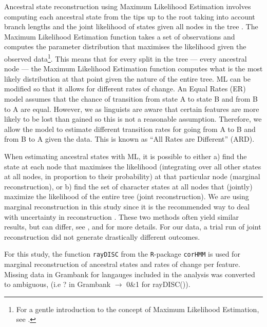 \documentclass[a4paper,10pt]{article} %
\begin{document}
Ancestral state reconstruction using Maximum Likelihood Estimation involves computing each ancestral state from the tips up to the root taking into account branch lengths and the joint likelihood of states given all nodes in the tree \citep{wilks1938large, fisher1912absolute, pagel1994detecting, cunningham1998reconstructing}. The Maximum Likelihood Estimation function takes a set of observations and computes the parameter distribution that maximises the likelihood given the observed data\footnote{For a gentle introduction to the concept of Maximum Likelihood Estimation, see \citet{jonny_ML}.}. This means that for every split in the tree --- every ancestral node --- the Maximum Likelihood Estimation function computes what is the most likely distribution at that point given the nature of the entire tree. ML can be modified so that it allows for different rates of change. An Equal Rates (ER) model assumes that the chance of transition from state A to state B and from B to A are equal. However, we as linguists are aware that certain features are more likely to be lost than gained so this is not a reasonable assumption. Therefore, we allow the model to estimate different transition rates for going from A to B and from B to A given the data. This is known as ``All Rates are Different'' (ARD).

When estimating ancestral states with ML, it is possible to either a) find the state at each node that maximises the likelihood (integrating over all other states at all nodes, in proportion to their probability) at that particular node (marginal reconstruction), or b) find the set of character states at all nodes that (jointly) maximize the likelihood of the entire tree (joint reconstruction). We are using marginal reconstruction in this study since it is the recommended way to deal with uncertainty in reconstruction \citep{revell_2014}. These two methods often yield similar results, but can differ, see \citet[259-260]{felsenstein2004inferring},  \citet[121-126]{yang2006computational} and \citet[5]{joy2016ancestral} for more details. For our data, a trial run of joint reconstruction did not generate drastically different outcomes.

For this study, the function \texttt{rayDISC} from the \texttt{R}-package \texttt{corHMM} \citep{corHMM} is used for marginal reconstruction of ancestral states and rates of change per feature. Missing data in Grambank for langauges included in the analysis was converted to ambiguous, (i.e ? in Grambank $\rightarrow$ 0\&1 for rayDISC()). 
\end{document}

